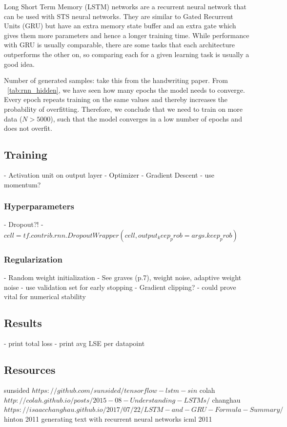 Long Short Term Memory (LSTM) networks are a recurrent neural network that can be used with STS neural networks. They are similar to Gated Recurrent Units (GRU) but have an extra memory state buffer and an extra gate which gives them more parameters and hence a longer training time. While performance with GRU is usually comparable, there are some tasks that each architecture outperforms the other on, so comparing each for a given learning task is usually a good idea.


Number of generated samples: take this from the handwriting paper.
From ~\cref{tab:rnn_hidden}, we have seen how many epochs the model needs to converge. Every epoch repeats training on the same values and thereby increases the probability of overfitting. Therefore, we conclude that we need to train on more data ($N > 5000$), such that the model converges in a low number of epochs and does not overfit.

\subsection{Training}
- Activation unit on output layer
- Optimizer
	- Gradient Descent
		- use momentum?

\subsubsection{Hyperparameters}
- Dropout?!
	- $cell = tf.contrib.rnn.DropoutWrapper(cell, output_keep_prob = args.keep_prob)$

\subsubsection{Regularization}
- Random weight initialization
	- See graves (p.7), weight noise, adaptive weight noise
- use validation set for early stopping
- Gradient clipping?
	- could prove vital for numerical stability
	
\subsection{Results}
- print total loss
- print avg LSE per datapoint


\subsection{Resources}
sunsided $https://github.com/sunsided/tensorflow-lstm-sin$
colah $http://colah.github.io/posts/2015-08-Understanding-LSTMs/$
changhau $https://isaacchanghau.github.io/2017/07/22/LSTM-and-GRU-Formula-Summary/$
hinton 2011 generating text with recurrent neural networks icml 2011